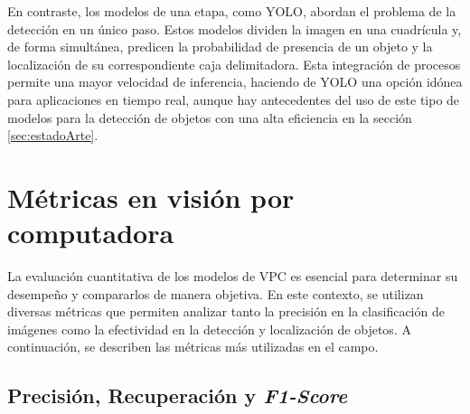 En contraste, los modelos de una etapa, como YOLO, abordan el problema de la detección en un único paso. Estos modelos dividen la imagen en una cuadrícula y, de forma simultánea, predicen la probabilidad de presencia de un objeto y la localización de su correspondiente caja delimitadora. Esta integración de procesos permite una mayor velocidad de inferencia, haciendo de YOLO una opción idónea para aplicaciones en tiempo real, aunque hay antecedentes del uso de este tipo de modelos para la detección de objetos con una alta eficiencia en la sección \ref{sec:estadoArte}.


\section{Métricas en visión por computadora} \label{sec:metricasVisPC}

La evaluación cuantitativa de los modelos de VPC es esencial para determinar su desempeño y compararlos de manera objetiva. En este contexto, se utilizan diversas métricas que permiten analizar tanto la precisión en la clasificación de imágenes como la efectividad en la detección y localización de objetos. A continuación, se describen las métricas más utilizadas en el campo.

\subsection{Precisión, Recuperación y \textit{F1-Score}}

